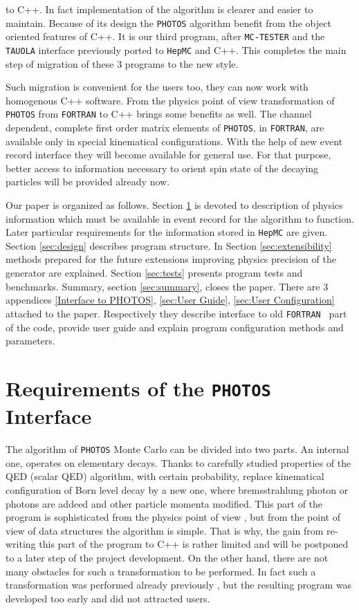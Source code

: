 \documentclass[]{Photos_interface_design}
\begin{document}
 to C++. In fact implementation of the algorithm is clearer and easier to
 maintain. Because of its design the {\tt PHOTOS} algorithm benefit from the object 
oriented features of C++. It is our third program, after {\tt MC-TESTER} \cite{Davidson:2008ma}
and the {\tt TAUOLA} interface \cite{Davidson:2010rw} previously ported to {\tt HepMC} and C++.
This completes the main step of migration of these 3 programs to the new style.

Such migration is convenient for the users too,  they can now work
with  homogenous C++ software. From the physics point of view transformation 
of {\tt PHOTOS} 
from {\tt FORTRAN} to C++  brings some benefits as well.
The channel dependent, complete first order matrix elements of {\tt PHOTOS}, in {\tt FORTRAN},
 are available only 
in special
kinematical configurations. With the help of new event record interface they will become
available for general use.
For that purpose, better access to information necessary to orient spin state of the decaying particles
will be provided already now.



Our paper is organized as follows. Section \ref{sec:requrements} is devoted
to description of physics information which must be available in event
record for the algorithm to function. Later particular requirements for the 
information stored in {\tt HepMC} are given. Section \ref{sec:design} describes
program structure. In Section  \ref{sec:extensibility} methods prepared for the
future extensions improving physics precision of the generator are explained.
Section \ref{sec:tests} presents program tests and benchmarks. 
Summary, section \ref{sec:summary}, closes the paper.
There are 3 appendices \ref{Interface to PHOTOS}, 
\ref{sec:User Guide}, \ref{sec:User Configuration} attached to the paper.
Respectively they describe interface to old {\tt FORTRAN } part of the code,
provide user guide and explain program configuration methods and parameters. 


\section{Requirements of the {\tt PHOTOS} Interface}
\label{sec:requrements}
The algorithm of {\tt PHOTOS} Monte Carlo can be divided into two parts.
An internal one, operates on elementary decays. Thanks to carefully 
studied properties of the 
QED (scalar QED) algorithm, with certain probability, 
replace  kinematical configuration of Born level decay by a new one, 
where bremsstrahlung photon or photons
are addeed and other particle momenta modified. This part of the program is sophisticated from the physics 
point of view \cite{Nanava:2006vv,Golonka:2006tw},
but from the point of view of data structures the algorithm is simple.
That is why, the gain from re-writing this part of the program to C++ is rather
limited and will be postponed to a later step of the project development.
On the other hand, there are not many obstacles for such a transformation to be
performed. In fact such a transformation was performed already
previously \cite{photosplus}, but the resulting program was developed too early 
and did not attracted users.
\end{document}
